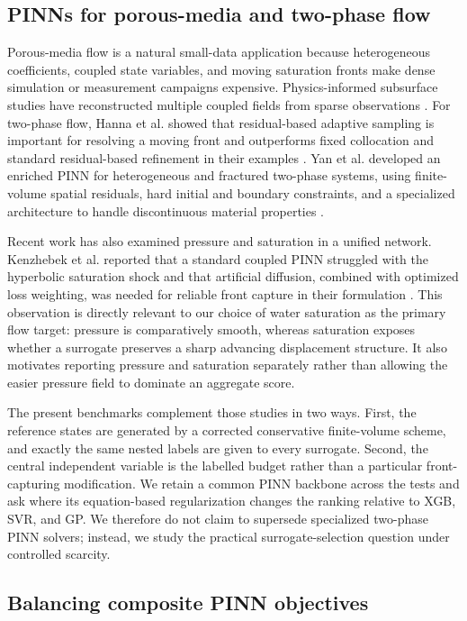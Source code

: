 \subsection{PINNs for porous-media and two-phase flow}

Porous-media flow is a natural small-data application because heterogeneous coefficients, coupled state variables, and moving saturation fronts make dense simulation or measurement campaigns expensive. Physics-informed subsurface studies have reconstructed multiple coupled fields from sparse observations \cite{He2020}. For two-phase flow, Hanna et al. showed that residual-based adaptive sampling is important for resolving a moving front and outperforms fixed collocation and standard residual-based refinement in their examples \cite{Hanna2022}. Yan et al. developed an enriched PINN for heterogeneous and fractured two-phase systems, using finite-volume spatial residuals, hard initial and boundary constraints, and a specialized architecture to handle discontinuous material properties \cite{Yan2024}.

Recent work has also examined pressure and saturation in a unified network. Kenzhebek et al. reported that a standard coupled PINN struggled with the hyperbolic saturation shock and that artificial diffusion, combined with optimized loss weighting, was needed for reliable front capture in their formulation \cite{Kenzhebek2025}. This observation is directly relevant to our choice of water saturation as the primary flow target: pressure is comparatively smooth, whereas saturation exposes whether a surrogate preserves a sharp advancing displacement structure. It also motivates reporting pressure and saturation separately rather than allowing the easier pressure field to dominate an aggregate score.

The present benchmarks complement those studies in two ways. First, the reference states are generated by a corrected conservative finite-volume scheme, and exactly the same nested labels are given to every surrogate. Second, the central independent variable is the labelled budget rather than a particular front-capturing modification. We retain a common PINN backbone across the tests and ask where its equation-based regularization changes the ranking relative to XGB, SVR, and GP. We therefore do not claim to supersede specialized two-phase PINN solvers; instead, we study the practical surrogate-selection question under controlled scarcity.

\subsection{Balancing composite PINN objectives}


